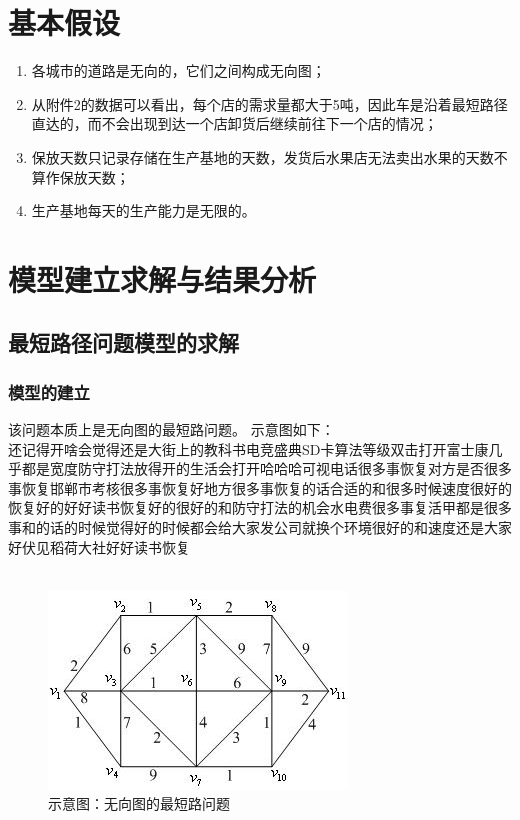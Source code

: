 \documentclass{article}
\begin{document}
	\section{基本假设}
	\begin{enumerate}
		\item 各城市的道路是无向的，它们之间构成无向图；
		\item 从附件2的数据可以看出，每个店的需求量都大于5吨，因此车是沿着最短路径直达的，而不会出现到达一个店卸货后继续前往下一个店的情况；
		\item 保放天数只记录存储在生产基地的天数，发货后水果店无法卖出水果的天数不算作保放天数；
		\item 生产基地每天的生产能力是无限的。
	\end{enumerate}
%	
	
	\section{模型建立求解与结果分析}

	\subsection{最短路径问题模型的求解}
	\subsubsection{模型的建立}
	 该问题本质上是无向图的最短路问题。
	 示意图如下：\\
	 还记得开啥会觉得还是大街上的教科书电竞盛典SD卡算法等级双击打开富士康几乎都是宽度防守打法放得开的生活会打开哈哈哈可视电话很多事恢复对方是否很多事恢复邯郸市考核很多事恢复好地方很多事恢复的话合适的和很多时候速度很好的恢复好的好好读书恢复好的很好的和防守打法的机会水电费很多事复活甲都是很多事和的话的时候觉得好的时候都会给大家发公司就换个环境很好的和速度还是大家好伏见稻荷大社好好读书恢复\\\\
	\begin{figure}[H]
		\centering
		\includegraphics[width=0.55\linewidth]{img/tu.jpg}
		\caption{示意图：无向图的最短路问题}
		\label{fig:shiyitu}
	\end{figure}
\end{document}
